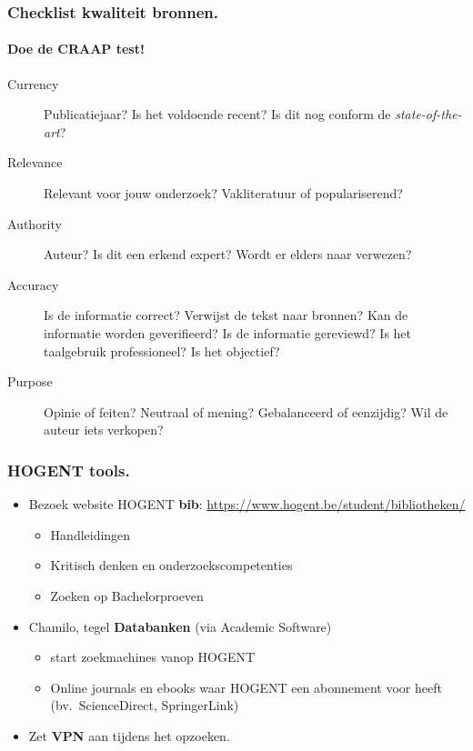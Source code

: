 \documentclass[aspectratio=169]{beamer}
\begin{document}
\begin{frame}
  \frametitle{Checklist kwaliteit bronnen.}
  \framesubtitle{Doe de CRAAP test!}

  \begin{description}
    \item[Currency] Publicatiejaar? Is het voldoende recent? Is dit nog conform de \emph{state-of-the-art}?
    \item[Relevance] Relevant voor jouw onderzoek? Vakliteratuur of populariserend?
    \item[Authority] Auteur? Is dit een erkend expert? Wordt er elders naar verwezen?
    \item[Accuracy] Is de informatie correct? Verwijst de tekst naar bronnen? Kan de informatie worden geverifieerd? Is de informatie gereviewd? Is het taalgebruik professioneel? Is het objectief?
    \item[Purpose] Opinie of feiten? Neutraal of mening? Gebalanceerd of eenzijdig? Wil de auteur iets verkopen?
  \end{description}

\end{frame}

\begin{frame}
  \frametitle{HOGENT tools.}

  \begin{itemize}
    \item<+-> Bezoek website HOGENT \textbf{bib}: \url{https://www.hogent.be/student/bibliotheken/}
      \begin{itemize}
        \item Handleidingen
        \item Kritisch denken en onderzoekscompetenties
        \item Zoeken op Bachelorproeven
      \end{itemize}
    \item<+-> Chamilo, tegel \textbf{Databanken} (via Academic Software)
      \begin{itemize}
        \item start zoekmachines vanop HOGENT
        \item Online journals en ebooks waar HOGENT een abonnement voor heeft (bv.~ScienceDirect, SpringerLink)
      \end{itemize}
    \item<+-> Zet \textbf{VPN} aan tijdens het opzoeken.
  \end{itemize}
\end{frame}
\end{document}
